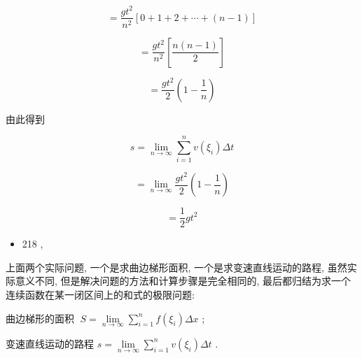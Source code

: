 \documentclass[lang=cn,newtx,12pt,scheme=chinese]{elegantbook}
\begin{document}
\[
= \frac{g{t}^{2}}{{n}^{2}}\left\lbrack {0 + 1 + 2 + \cdots + \left( {n - 1}\right) }\right\rbrack
\]

\[
= \frac{g{t}^{2}}{{n}^{2}}\left\lbrack \frac{n\left( {n - 1}\right) }{2}\right\rbrack
\]

\[
= \frac{g{t}^{2}}{2}\left( {1 - \frac{1}{n}}\right)
\]

由此得到

\[
s = \mathop{\lim }\limits_{{n \rightarrow \infty }}\mathop{\sum }\limits_{{i = 1}}^{n}v\left( {\xi }_{i}\right) {\Delta t}
\]

\[
= \mathop{\lim }\limits_{{n \rightarrow \infty }}\frac{g{t}^{2}}{2}\left( {1 - \frac{1}{n}}\right)
\]

\[
= \frac{1}{2}g{t}^{2}
\]

\begin{itemize}
\item 218 ,
\end{itemize}

上面两个实际问题, 一个是求曲边梯形面积, 一个是求变速直线运动的路程, 虽然实际意义不同, 但是解决问题的方法和计算步骤是完全相同的, 最后都归结为求一个连续函数在某一闭区间上的和式的极限问题:

曲边梯形的面积 \(\;S = \mathop{\lim }\limits_{{n \rightarrow \infty }}\mathop{\sum }\limits_{{i = 1}}^{n}f\left( {\xi }_{i}\right) {\Delta x}\) ;

变速直线运动的路程 \(s = \mathop{\lim }\limits_{{n \rightarrow \infty }}\mathop{\sum }\limits_{{i = 1}}^{n}v\left( {\xi }_{i}\right) {\Delta t}\) .
\end{document}
